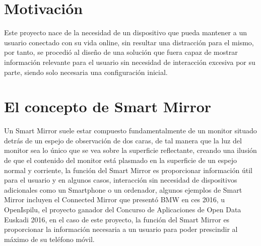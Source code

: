 \section{Motivación}

Este proyecto nace de la necesidad de un dispositivo que pueda mantener a un usuario conectado con su vida online, sin resultar una distracción para el mismo, por tanto, se procedió al diseño de una solución que fuera capaz de mostrar información relevante para el usuario sin necesidad de interacción excesiva por su parte, siendo solo necesaria una configuración inicial.

\section{El concepto de Smart Mirror}

Un Smart Mirror suele estar compuesto fundamentalmente de un monitor situado detrás de un espejo de observación de dos caras, de tal manera que la luz del monitor sea lo único que se vea sobre la superficie reflectante, creando una ilusión de que el contenido del monitor está plasmado en la superficie de un espejo normal y corriente, la función del Smart Mirror es proporcionar información útil para el usuario y en algunos casos, interacción sin necesidad de dispositivos adicionales como un Smartphone o un ordenador, algunos ejemplos de Smart Mirror incluyen el Connected Mirror que presentó BMW en \acrshort{ces} 2016\cite{BMW}, u OpenIspilu\cite{OpenIspilu}, el proyecto ganador del Concurso de Aplicaciones de Open Data Euskadi 2016, en el caso de este proyecto, la función del Smart Mirror es proporcionar la información necesaria a un usuario para poder prescindir al máximo de su teléfono móvil.